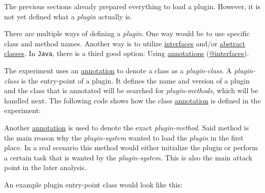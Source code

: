 The previous sections already prepared everything to load a plugin.
However, it is not yet defined what a \textit{plugin} actually is.

There are multiple ways of defining a \textit{plugin}.
One way would be to use specific class and method names.
Another way is to utilize \underline{interfaces} and/or \underline{abstract classes}.
In \texttt{Java}, there is a third good option: 
Using \underline{annotations} (\underline{@interfaces}).

The experiment uses an \underline{annotation} to denote a class as a \textit{plugin-class}.
A \textit{plugin-class} is the entry-point of a plugin.
It defines the name and version of a plugin and the class that is annotated will be searched for \textit{plugin-methods}, which will be handled next.
The following code shows how the class \underline{annotation} is defined in the experiment:


Another \underline{annotation} is used to denote the exact \textit{plugin-method}.
Said method is the main reason why the \textit{plugin-system} wanted to load the \textit{plugin} in the first place.
In a real scenario this method would either initialize the plugin or perform a certain task that is wanted by the \textit{plugin-system}.
This is also the main attack point in the later analysis.


\clearpage

An example plugin entry-point class would look like this:

